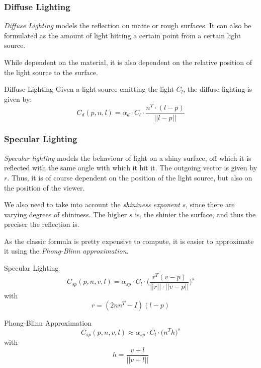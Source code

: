 \documentclass{panikzettel}
\begin{document}
\subsubsection*{Diffuse Lighting}


\begin{halfboxl}
\vspace{-\baselineskip}
\textit{Diffuse Lighting} models the reflection on matte or rough surfaces. It can also be formulated as the amount of light hitting a certain point from a certain light source.

While dependent on the material, it is also dependent on the relative position of the light source to the surface.
\end{halfboxl}%
\begin{halfboxr}
\vspace{-\baselineskip}
\begin{defi}{Diffuse Lighting}
Given a light source emitting the light $C_l$, the diffuse lighting is given by:
$$C_d(p,n,l) = \alpha_d \cdot C_l \cdot \frac{n^T \cdot (l-p)}{||l-p||}$$
\end{defi}
\end{halfboxr}

\subsubsection*{Specular Lighting}

\begin{halfboxl}
\textit{Specular lighting} models the behaviour of light on a shiny surface, off which it is reflected with the same angle with which it hit it. The outgoing vector is given by $r$. Thus, it is of course dependent on the position of the light source, but also on the position of the viewer.

We also need to take into account the \emph{shininess exponent} $s$, since there are varying degrees of shininess. The higher $s$ is, the shinier the surface, and thus the preciser the reflection is.

As the classic formula is pretty expensive to compute, it is easier to approximate it using the \emph{Phong-Blinn approximation}.
\end{halfboxl}%
\begin{halfboxr}
\vspace{-\baselineskip}
\begin{defi}{Specular Lighting}
$$C_{sp} (p,n,v,l) = \alpha_{sp} \cdot C_l \cdot \bigg(\frac{r^T(v-p)}{||r||\cdot||v-p||}\bigg)^s$$ with $$r = (2nn^T-I)(l-p)$$
\end{defi}

\begin{defi}{Phong-Blinn Approximation}
$$C_{sp}(p,n,v,l) \approx \alpha_{sp}  \cdot C_l \cdot \big(n^Th\big)^s$$ with $$h= \frac{v + l}{||v + l||}$$
\end{defi}
\end{halfboxr}
\end{document}
